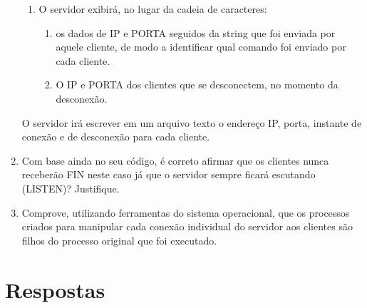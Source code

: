 \documentclass[12pt,a4paper]{report}
\begin{document}
\begin{enumerate}
\begin{enumerate}
        \item O servidor exibirá, no lugar da cadeia de caracteres:
        \begin{enumerate}
            \item os dados de IP e PORTA seguidos da string que foi enviada por aquele cliente, de modo a identificar qual comando foi enviado por cada cliente.
            
            \item O IP e PORTA dos clientes que se desconectem, no momento da desconexão.
        \end{enumerate}
    \end{enumerate}
    O servidor irá escrever em um arquivo texto o endereço IP, porta, instante de conexão e de desconexão para cada cliente.
    
    \item Com base ainda no seu código, é correto afirmar que os clientes nunca receberão FIN neste caso já que o servidor sempre ficará escutando (LISTEN)? Justifique.
    
    \item Comprove, utilizando ferramentas do sistema operacional, que os processos criados para manipular cada conexão individual do servidor aos clientes são filhos do processo original que foi executado.
\end{enumerate}

\section{Respostas}
\end{document}

